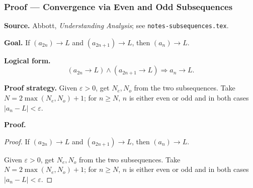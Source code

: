 
\clearpage
{}
\hypertarget{proof-RA-ABB-T-conv-even-odd}{}

\subsubsection[Convergence via Even and Odd Subsequences]{Proof --- Convergence via Even and Odd Subsequences}

\bigskip

\noindent
\textbf{Source.}
Abbott, \emph{Understanding Analysis}; see \texttt{notes-subsequences.tex}.

\vspace{0.75em}

\noindent
\textbf{Goal.}
If $(a_{2n}) \to L$ and $(a_{2n+1}) \to L$, then $(a_n) \to L$.

\vspace{0.75em}

\noindent
\textbf{Logical form.}
\[
  (a_{2n} \to L) \wedge (a_{2n+1} \to L) \Rightarrow a_n \to L.
\]

\vspace{0.75em}

\noindent
\textbf{Proof strategy.}
Given $\varepsilon > 0$, get $N_e, N_o$ from the two subsequences. Take $N = 2\max(N_e, N_o) + 1$; for $n \ge N$, $n$ is either even or odd and in both cases $|a_n - L| < \varepsilon$.

\vspace{0.75em}

\noindent
\textbf{Proof.}
\begin{proof}
\Claim If $(a_{2n}) \to L$ and $(a_{2n+1}) \to L$, then $(a_n) \to L$.

\Given 

\Goal 

\Strategy Given $\varepsilon > 0$, get $N_e, N_o$ from the two subsequences. Take $N = 2\max(N_e, N_o) + 1$; for $n \ge N$, $n$ is either even or odd and in both cases $|a_n - L| < \varepsilon$.

\medskip


\end{proof}

